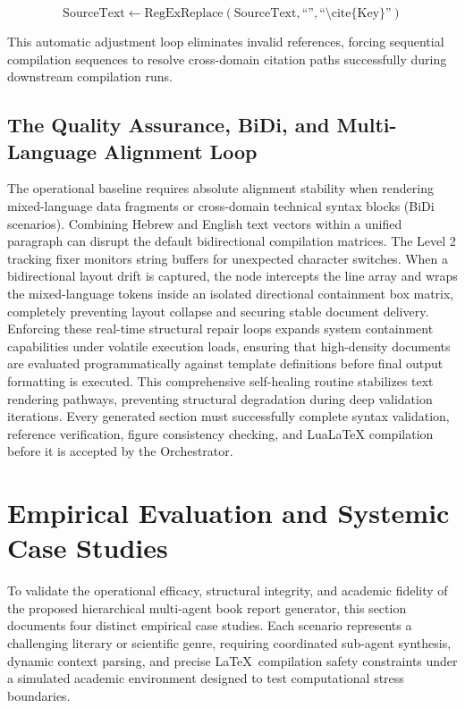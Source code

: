 \begin{equation}
\text{SourceText} \leftarrow \text{RegExReplace}\left(\text{SourceText}, \text{``''}, \text{``\textbackslash cite\{Key\}''} \right)
\end{equation}

This automatic adjustment loop eliminates invalid references, forcing sequential compilation sequences to resolve cross-domain citation paths successfully during downstream compilation runs.

\subsection{The Quality Assurance, BiDi, and Multi-Language Alignment Loop}
The operational baseline requires absolute alignment stability when rendering mixed-language data fragments or cross-domain technical syntax blocks (BiDi scenarios). Combining Hebrew and English text vectors within a unified paragraph can disrupt the default bidirectional compilation matrices. The Level 2 tracking fixer monitors string buffers for unexpected character switches. When a bidirectional layout drift is captured, the node intercepts the line array and wraps the mixed-language tokens inside an isolated directional containment box matrix, completely preventing layout collapse and securing stable document delivery. Enforcing these real-time structural repair loops expands system containment capabilities under volatile execution loads, ensuring that high-density documents are evaluated programmatically against template definitions before final output formatting is executed. This comprehensive self-healing routine stabilizes text rendering pathways, preventing structural degradation during deep validation iterations. Every generated section must successfully complete syntax validation, reference verification, figure consistency checking, and LuaLaTeX compilation before it is accepted by the Orchestrator.


\section{Empirical Evaluation and Systemic Case Studies}
To validate the operational efficacy, structural integrity, and academic fidelity of the proposed hierarchical multi-agent book report generator, this section documents four distinct empirical case studies. Each scenario represents a challenging literary or scientific genre, requiring coordinated sub-agent synthesis, dynamic context parsing, and precise \LaTeX\ compilation safety constraints under a simulated academic environment designed to test computational stress boundaries.

